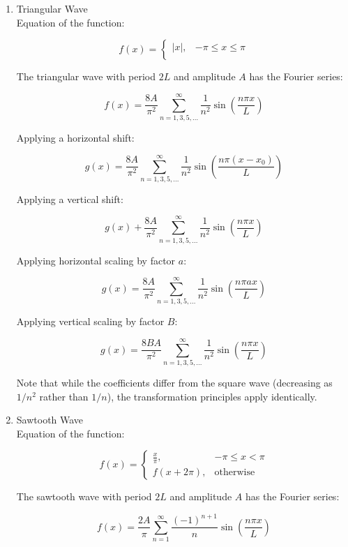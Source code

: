 \documentclass{article}
\begin{document}
    \begin{enumerate}
    \item Triangular Wave\\
Equation of the function: 

\begin{equation}
f(x) = 
\begin{cases} 
|x|, & -\pi \leq x \leq \pi \\
\end{cases}
\end{equation}

The triangular wave with period $2L$ and amplitude $A$ has the Fourier series:

$$f(x) = \frac{8A}{\pi^2} \sum_{n=1,3,5,...}^{\infty} \frac{1}{n^2} \sin\left(\frac{n\pi x}{L}\right)$$

Applying a horizontal shift:

$$g(x) = \frac{8A}{\pi^2} \sum_{n=1,3,5,...}^{\infty} \frac{1}{n^2} \sin\left(\frac{n\pi (x-x_0)}{L}\right)$$

Applying a vertical shift:

$$g(x) + \frac{8A}{\pi^2} \sum_{n=1,3,5,...}^{\infty} \frac{1}{n^2} \sin\left(\frac{n\pi x}{L}\right)$$

Applying horizontal scaling by factor $a$:

$$g(x) = \frac{8A}{\pi^2} \sum_{n=1,3,5,...}^{\infty} \frac{1}{n^2} \sin\left(\frac{n\pi ax}{L}\right)$$

Applying vertical scaling by factor $B$:

$$g(x) = \frac{8BA}{\pi^2} \sum_{n=1,3,5,...}^{\infty} \frac{1}{n^2} \sin\left(\frac{n\pi x}{L}\right)$$

Note that while the coefficients differ from the square wave (decreasing as $1/n^2$ rather than $1/n$), the transformation principles apply identically.

    \item Sawtooth Wave\\
Equation of the function: 

\begin{equation}
f(x) = 
\begin{cases} 
\frac{x}{\pi}, & -\pi \leq x < \pi \\
f(x + 2\pi), & \text{otherwise}
\end{cases}
\end{equation}

The sawtooth wave with period $2L$ and amplitude $A$ has the Fourier series:

$$f(x) = \frac{2A}{\pi} \sum_{n=1}^{\infty} \frac{(-1)^{n+1}}{n} \sin\left(\frac{n\pi x}{L}\right)$$


\end{enumerate}
\end{document}
